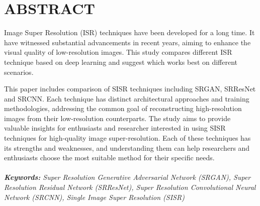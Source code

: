 \newpage

\section*{ABSTRACT}

Image Super Resolution (ISR) techniques have been developed for a long time. It have witnessed substantial advancements in recent years, aiming to enhance the visual quality of low-resolution images. This study compares different ISR technique based on deep learning and suggest which works best on different scenarios.


This paper includes comparison of SISR techniques including SRGAN, SRResNet and SRCNN. Each technique has distinct architectural approaches and training methodologies, addressing the common goal of reconstructing high-resolution images from their low-resolution counterparts. The study aims to provide valuable insights for enthusiasts and researcher interested in using SISR techniques for high-quality image super-resolution. Each of these techniques has its strengths and weaknesses, and understanding them can help researchers and enthusiasts choose the most suitable method for their specific needs.
\\
\\
\textit {{\bf Keywords:}  Super Resolution Generative Adversarial Network (SRGAN), Super Resolution Residual Network (SRResNet), Super Resolution Convolutional Neural Network (SRCNN), Single Image Super Resolution (SISR) }
